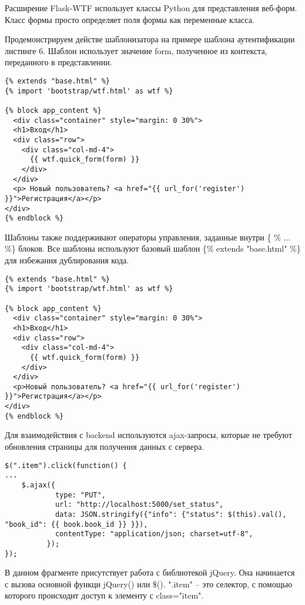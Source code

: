 Расширение Flask-WTF использует классы Python для представления веб-форм. Класс формы просто определяет поля формы как переменные класса.

Продемонстрируем действе шаблонизатора на примере шаблона аутентификации листинге 6. Шаблон использует значение form, полученное из контекста, переданного в представлении. 

\begin{lstlisting}[label=some-code, caption=Шаблон login.html]
{% extends "base.html" %}
{% import 'bootstrap/wtf.html' as wtf %}

{% block app_content %}
  <div class="container" style="margin: 0 30%">
  <h1>Вход</h1>
  <div class="row">
    <div class="col-md-4">
      {{ wtf.quick_form(form) }}
    </div>
  </div>
  <p> Новый пользователь? <a href="{{ url_for('register') }}">Регистрация</a></p>
</div>
{% endblock %}
\end{lstlisting}

Шаблоны также поддерживают операторы управления, заданные внутри \{ \% ... \%\} блоков.
Все шаблоны используют базовый шаблон \{\% extends "base.html" \%\} для избежания дублирования кода.

\begin{lstlisting}[label=some-code, caption=Шаблон base.html]
{% extends "base.html" %}
{% import 'bootstrap/wtf.html' as wtf %}

{% block app_content %}
  <div class="container" style="margin: 0 30%">
  <h1>Вход</h1>
  <div class="row">
    <div class="col-md-4">
      {{ wtf.quick_form(form) }}
    </div>
  </div>
  <p>Новый пользователь? <a href="{{ url_for('register') }}">Регистрация</a></p>
</div>
{% endblock %}
\end{lstlisting}

Для взаимодействия с backend используются ajax-запросы, которые не требуют обновления страницы для получения данных с сервера.

\begin{lstlisting}[label=some-code, caption=Пример части кода с использованием ajax-запроса для изменения статуса книги в БД]
$(".item").click(function() {
...
	$.ajax({
            type: "PUT",
            url: "http://localhost:5000/set_status",
            data: JSON.stringify({"info": {"status": $(this).val(), "book_id": {{ book.book_id }} }}),
            contentType: "application/json; charset=utf-8",
          });
});
\end{lstlisting}

В данном фрагменте присутствует работа с библиотекой jQuery. Она начинается с вызова основной функци jQuery() или \$(). ".item" – это селектор, с помощью которого происходит доступ к элементу с class="item".

